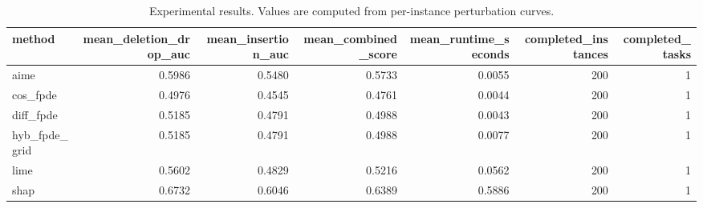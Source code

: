 \begin{table}[t]
\caption{Experimental results. Values are computed from per-instance perturbation curves.}
\label{tab:main_results_computed}
\centering
\begin{tabular}{lrrrrrr}
\toprule
method & mean\_deletion\_drop\_auc & mean\_insertion\_auc & mean\_combined\_score & mean\_runtime\_seconds & completed\_instances & completed\_tasks \\
\midrule
aime & 0.5986 & 0.5480 & 0.5733 & 0.0055 & 200 & 1 \\
cos\_fpde & 0.4976 & 0.4545 & 0.4761 & 0.0044 & 200 & 1 \\
diff\_fpde & 0.5185 & 0.4791 & 0.4988 & 0.0043 & 200 & 1 \\
hyb\_fpde\_grid & 0.5185 & 0.4791 & 0.4988 & 0.0077 & 200 & 1 \\
lime & 0.5602 & 0.4829 & 0.5216 & 0.0562 & 200 & 1 \\
shap & 0.6732 & 0.6046 & 0.6389 & 0.5886 & 200 & 1 \\
\bottomrule
\end{tabular}

\end{table}

